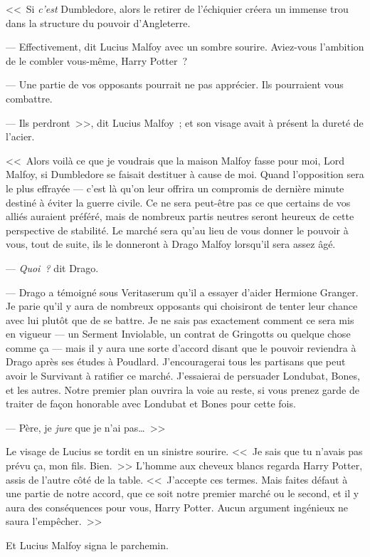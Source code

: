 <<~Si \emph{c'est} Dumbledore, alors le retirer de l'échiquier créera un immense trou dans la structure du pouvoir d'Angleterre.

--- Effectivement, dit Lucius Malfoy avec un sombre sourire. Aviez-vous l'ambition de le combler vous-même, Harry Potter~?

--- Une partie de vos opposants pourrait ne pas apprécier. Ils pourraient vous combattre.

--- Ils perdront~>>, dit Lucius Malfoy~; et son visage avait à présent la dureté de l'acier.

<<~Alors voilà ce que je voudrais que la maison Malfoy fasse pour moi, Lord Malfoy, si Dumbledore se faisait destituer à cause de moi. Quand l'opposition sera le plus effrayée — c'est là qu'on leur offrira un compromis de dernière minute destiné à éviter la guerre civile. Ce ne sera peut-être pas ce que certains de vos alliés auraient préféré, mais de nombreux partis neutres seront heureux de cette perspective de stabilité. Le marché sera qu'au lieu de vous donner le pouvoir à vous, tout de suite, ils le donneront à Drago Malfoy lorsqu'il sera assez âgé.

--- \emph{Quoi~?} dit Drago.

--- Drago a témoigné sous Veritaserum qu'il a essayer d'aider Hermione Granger. Je parie qu'il y aura de nombreux opposants qui choisiront de tenter leur chance avec lui plutôt que de se battre. Je ne sais pas exactement comment ce sera mis en vigueur — un Serment Inviolable, un contrat de Gringotts ou quelque chose comme ça — mais il y aura une sorte d'accord disant que le pouvoir reviendra à Drago après ses études à Poudlard. J'encouragerai tous les partisans que peut avoir le Survivant à ratifier ce marché. J'essaierai de persuader Londubat, Bones, et les autres. Notre premier plan ouvrira la voie au reste, si vous prenez garde de traiter de façon honorable avec Londubat et Bones pour cette fois.

--- Père, je \emph{jure} que je n'ai pas…~>>

Le visage de Lucius se tordit en un sinistre sourire. <<~Je sais que tu n'avais pas prévu ça, mon fils. Bien.~>> L'homme aux cheveux blancs regarda Harry Potter, assis de l'autre côté de la table. <<~J'accepte ces termes. Mais faites défaut à une partie de notre accord, que ce soit notre premier marché ou le second, et il y aura des conséquences pour vous, Harry Potter. Aucun argument ingénieux ne saura l'empêcher.~>>

Et Lucius Malfoy signa le parchemin.

